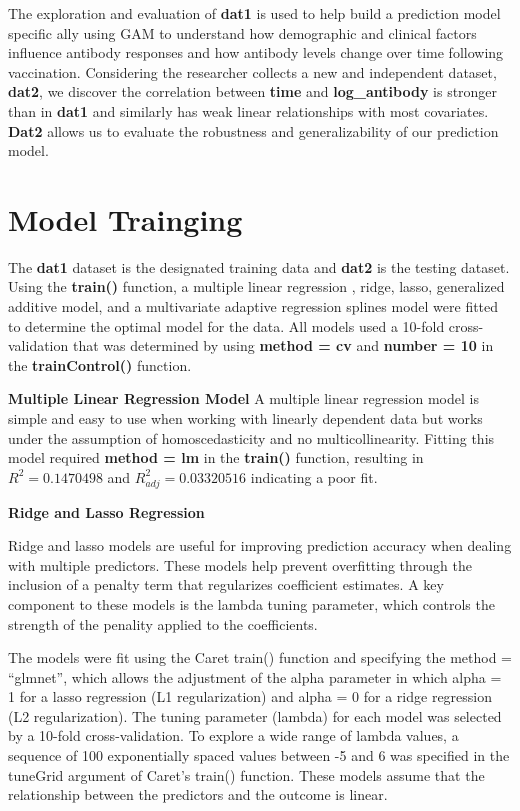 \documentclass[
]{article}
\begin{document}
The exploration and evaluation of \textbf{dat1} is used to help build a
prediction model specific ally using GAM to understand how demographic
and clinical factors influence antibody responses and how antibody
levels change over time following vaccination. Considering the
researcher collects a new and independent dataset, \textbf{dat2}, we
discover the correlation between \textbf{time} and
\textbf{log\_antibody} is stronger than in \textbf{dat1} and similarly
has weak linear relationships with most covariates. \textbf{Dat2} allows
us to evaluate the robustness and generalizability of our prediction
model.

\section{Model Trainging}\label{model-trainging}

The \textbf{dat1} dataset is the designated training data and
\textbf{dat2} is the testing dataset. Using the \textbf{train()}
function, a multiple linear regression , ridge, lasso, generalized
additive model, and a multivariate adaptive regression splines model
were fitted to determine the optimal model for the data. All models used
a 10-fold cross-validation that was determined by using \textbf{method =
cv} and \textbf{number = 10} in the \textbf{trainControl()} function.

\textbf{Multiple Linear Regression Model} A multiple linear regression
model is simple and easy to use when working with linearly dependent
data but works under the assumption of homoscedasticity and no
multicollinearity. Fitting this model required \textbf{method = lm} in
the \textbf{train()} function, resulting in \(R^2 = 0.1470498\) and
\(R_{adj}^2 = 0.03320516\) indicating a poor fit.

\textbf{Ridge and Lasso Regression}

Ridge and lasso models are useful for improving prediction accuracy when
dealing with multiple predictors. These models help prevent overfitting
through the inclusion of a penalty term that regularizes coefficient
estimates. A key component to these models is the lambda tuning
parameter, which controls the strength of the penality applied to the
coefficients.

The models were fit using the Caret train() function and specifying the
method = ``glmnet'', which allows the adjustment of the alpha parameter
in which alpha = 1 for a lasso regression (L1 regularization) and alpha
= 0 for a ridge regression (L2 regularization). The tuning parameter
(lambda) for each model was selected by a 10-fold cross-validation. To
explore a wide range of lambda values, a sequence of 100 exponentially
spaced values between -5 and 6 was specified in the tuneGrid argument of
Caret's train() function. These models assume that the relationship
between the predictors and the outcome is linear.
\end{document}
